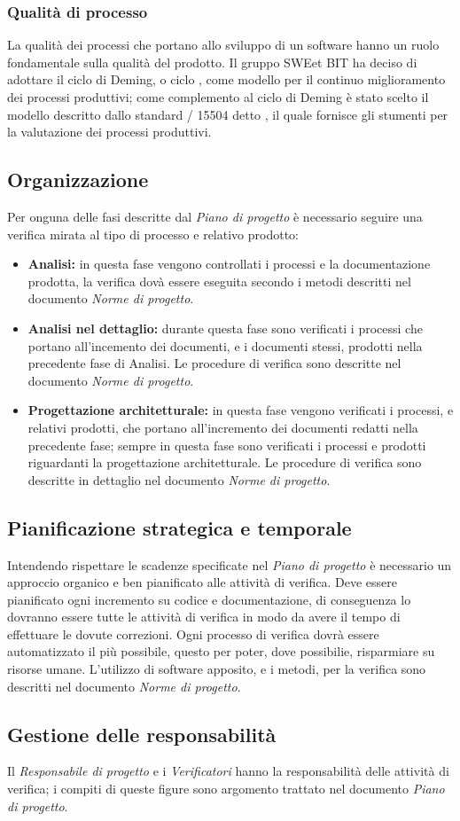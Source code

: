     \subsubsection{Qualità di processo}
    La qualità dei processi che portano allo sviluppo di un software hanno un ruolo fondamentale sulla qualità del prodotto.
    Il gruppo SWEet BIT ha deciso di adottare il ciclo di Deming, o ciclo , come modello per il continuo miglioramento dei processi produttivi;
    come complemento al ciclo di Deming è stato scelto il modello descritto dallo standard / 15504 detto ,
    il quale fornisce gli stumenti per la valutazione dei processi produttivi.

  \subsection{Organizzazione}
    Per onguna delle fasi descritte dal \emph{Piano di progetto} è necessario seguire una verifica mirata al tipo di processo e relativo prodotto:
    \begin{itemize}
      \item \textbf{Analisi:} in questa fase vengono controllati i processi e la documentazione prodotta,
      la verifica dovà essere eseguita secondo i metodi descritti nel documento \emph{Norme di progetto}.
      \item \textbf{Analisi nel dettaglio:} durante questa fase sono verificati i processi che portano all'incemento dei documenti, e i documenti stessi, prodotti nella precedente fase di Analisi.
      Le procedure di verifica sono descritte nel documento \emph{Norme di progetto}.
      \item \textbf{Progettazione architetturale:} in questa fase vengono verificati i processi, e relativi prodotti, che portano all'incremento dei documenti redatti nella precedente fase;
      sempre in questa fase sono verificati i processi e prodotti riguardanti la progettazione architetturale.
      Le procedure di verifica sono descritte in dettaglio nel documento \emph{Norme di progetto}.
    \end{itemize}
  \subsection{Pianificazione strategica e temporale}
    Intendendo rispettare le scadenze specificate nel \emph{Piano di progetto} è necessario un approccio organico e ben pianificato alle attività di verifica.
    Deve essere pianificato ogni incremento su codice e documentazione, di conseguenza lo dovranno essere tutte le attività di verifica
    in modo da avere il tempo di effettuare le dovute correzioni. Ogni processo di verifica dovrà essere automatizzato il più possibile, questo per poter, dove possibilie,
    risparmiare su risorse umane. L'utilizzo di software apposito, e i metodi, per la verifica sono descritti nel documento \emph{Norme di progetto}.
  \subsection{Gestione delle responsabilità}
    Il \emph{Responsabile di progetto} e i \emph{Verificatori} hanno la responsabilità delle attività di verifica;
    i compiti di queste figure sono argomento trattato nel documento \emph{Piano di progetto}.

